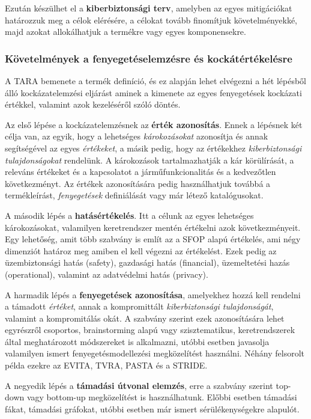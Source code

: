 Ezután készülhet el a \textbf{kiberbiztonsági terv}, amelyben az egyes mitigációkat határozzuk meg a célok elérésére, a célokat tovább finomítjuk követelményekké, majd azokat allokálhatjuk a termékre vagy egyes komponensekre.

\subsubsection{Követelmények a fenyegetéselemzésre és kockátértékelésre}
A TARA bemenete a termék definíció, és ez alapján lehet elvégezni a hét lépésből álló kockázatelemzési eljárást aminek a kimenete az egyes fenyegetések kockázati értékkel, valamint azok kezeléséről szóló döntés.

Az első lépése a kockázatelemzésnek az \textbf{érték azonosítás}. Ennek a lépésnek két célja van, az egyik, hogy a lehetséges \textit{károkozásokat} azonosítja és annak segítségével az egyes \textit{értékeket}, a másik pedig, hogy az értékekhez \textit{kiberbiztonsági tulajdonságokat} rendelünk. 
A károkozások tartalmazhatják a kár körülírását, a releváns értékeket és a kapcsolatot a járműfunkcionalitás és a kedvezőtlen következményt.
Az értékek azonosítására pedig használhatjuk továbbá a termékleírást, \textit{fenyegetések} definiálását vagy már létező katalógusokat.

A második lépés a \textbf{hatásértékelés}. Itt a célunk az egyes lehetséges károkozásokat, valamilyen keretrendszer mentén értékelni azok következményeit. Egy lehetőség, amit több szabvány is említ az a SFOP alapú értékelés, ami négy dimenziót határoz meg amiben el kell végezni az értékelést. Ezek pedig az üzembiztonsági hatás (safety), gazdasági hatás (financial), üzemeltetési hazás (operational), valamint az adatvédelmi hatás (privacy).

A harmadik lépés a \textbf{fenyegetések azonosítása}, amelyekhez hozzá kell rendelni a támadott \textit{értéket}, annak a kompromittált \textit{kiberbiztonsági tulajdonságát}, valamint a kompromitálás okát. A szabvány szerint ezek azonosítására lehet egyrészről csoportos, brainstorming alapú vagy szisztematikus, keretrendszerek által meghatározott módszereket is alkalmazni, utóbbi esetben javasolja valamilyen ismert fenyegetésmodellezési megközelítést használni. Néhány felsorolt példa ezekre az EVITA, TVRA, PASTA és a STRIDE.

A negyedik lépés a \textbf{támadási útvonal elemzés}, erre a szabvány szerint top-down vagy bottom-up megközelítést is használhatunk. Előbbi esetben támadási fákat, támadási gráfokat, utóbbi esetben már ismert sérülékenységekre alapulót.

